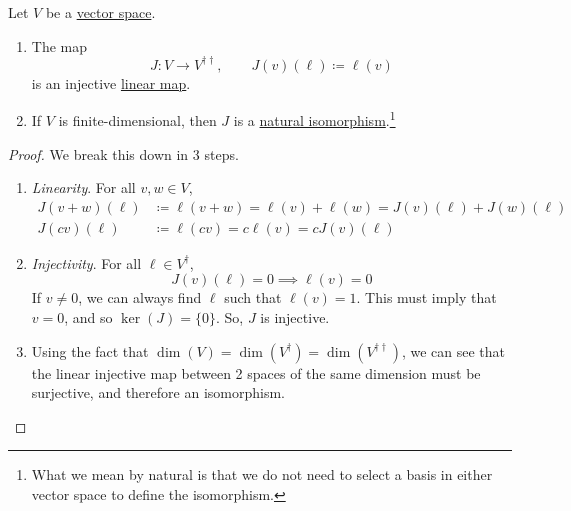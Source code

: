   \begin{theorem}
    \label{thm:canonical-isomorphisms-of-double-duals}
		Let $V$ be a \hyperref[def:vector-space]{vector space}. 
		\begin{enumerate}
		  \item The map 
				\begin{equation}
					J: V \to V^{\dagger\dagger}, \qquad J(v)(\ell) \coloneqq \ell(v) 
				\end{equation}
				is an injective \hyperref[def:linear_map]{linear map}. 
			\item If $V$ is finite-dimensional, then $J$ is a \hyperref[cat-def:natural-isomorphism]{natural isomorphism}.\footnote{What we mean by natural is that we do not need to select a basis in either vector space to define the isomorphism.}  
		\end{enumerate}
  \end{theorem}
  \begin{proof}
		We break this down in 3 steps. 
		\begin{enumerate}
		  \item \textit{Linearity}. For all $v, w \in V$, 
				\begin{align}
					J(v + w)(\ell) & \coloneqq \ell(v + w) = \ell(v) + \ell(w) = J(v)(\ell) + J(w)(\ell) \\ 
					J(cv)(\ell) & \coloneqq \ell(cv) = c \ell(v) = c J(v)(\ell)
				\end{align}
			\item \textit{Injectivity}. For all $\ell \in V^\dagger$, 
				\begin{equation}
				  J(v)(\ell) = 0 \implies \ell(v) = 0
				\end{equation}
				If $v \neq 0$, we can always find $\ell$ such that $\ell(v) = 1$. This must imply that $v = 0$, and so $\ker(J) = \{0\}$. So, $J$ is injective. 

			\item Using the fact that $\dim(V) = \dim(V^\dagger) = \dim(V^{\dagger\dagger})$, we can see that the linear injective map between 2 spaces of the same dimension must be surjective, and therefore an isomorphism. 
		\end{enumerate}
  \end{proof}

